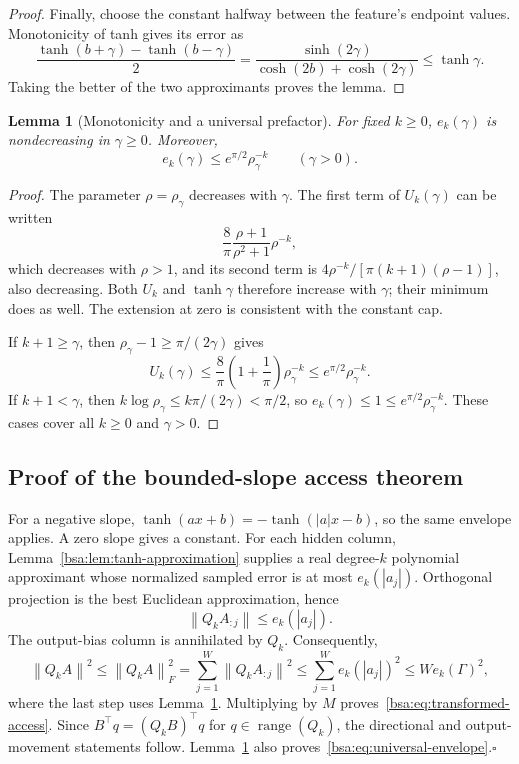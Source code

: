 \documentclass[11pt,letterpaper]{article}
\newcommand{\bsaNorm}[1]{\left\lVert #1\right\rVert}
\DeclareMathOperator{\bsaRange}{range}
\newtheorem{bsaLemma}{Lemma}[section]
\theoremstyle{remark}
\theoremstyle{plain}
\begin{document}
\begin{proof}
Finally, choose the constant halfway between the feature's endpoint values. Monotonicity of tanh gives its error as
\begin{equation}
 \frac{\tanh(b+\gamma)-\tanh(b-\gamma)}2
 =\frac{\sinh(2\gamma)}{\cosh(2b)+\cosh(2\gamma)}
 \le\tanh\gamma.
 \label{bsa:eq:constant-cap}
\end{equation}
Taking the better of the two approximants proves the lemma.
\end{proof}

\begin{bsaLemma}[Monotonicity and a universal prefactor]
\label{bsa:lem:universal}
For fixed $k\ge0$, $e_k(\gamma)$ is nondecreasing in $\gamma\ge0$. Moreover,
\begin{equation}
 e_k(\gamma)\le e^{\pi/2}\rho_\gamma^{-k}\qquad(\gamma>0).
 \label{bsa:eq:universal-feature}
\end{equation}
\end{bsaLemma}
\begin{proof}
The parameter $\rho=\rho_\gamma$ decreases with $\gamma$. The first term of $U_k(\gamma)$ can be written
\[
 \frac8\pi\frac{\rho+1}{\rho^2+1}\rho^{-k},
\]
which decreases with $\rho>1$, and its second term is
$4\rho^{-k}/[\pi(k+1)(\rho-1)]$, also decreasing. Both $U_k$ and $\tanh\gamma$ therefore increase with $\gamma$; their minimum does as well. The extension at zero is consistent with the constant cap.

If $k+1\ge\gamma$, then $\rho_\gamma-1\ge\pi/(2\gamma)$ gives
\begin{equation}
 U_k(\gamma)\le\frac8\pi\left(1+\frac1\pi\right)\rho_\gamma^{-k}
 \le e^{\pi/2}\rho_\gamma^{-k}.
 \label{bsa:eq:large-degree-envelope}
\end{equation}
If $k+1<\gamma$, then $k\log\rho_\gamma\le k\pi/(2\gamma)<\pi/2$, so
$e_k(\gamma)\le1\le e^{\pi/2}\rho_\gamma^{-k}$. These cases cover all $k\ge0$ and $\gamma>0$.
\end{proof}

\subsection{Proof of the bounded-slope access theorem}
For a negative slope, $\tanh(a x+b)=-\tanh(|a|x-b)$, so the same envelope applies. A zero slope gives a constant. For each hidden column, Lemma~\ref{bsa:lem:tanh-approximation} supplies a real degree-$k$ polynomial approximant whose normalized sampled error is at most $e_k(|a_j|)$. Orthogonal projection is the best Euclidean approximation, hence
\[
 \bsaNorm{Q_kA_{:j}}\le e_k(|a_j|).
\]
The output-bias column is annihilated by $Q_k$. Consequently,
\[
 \bsaNorm{Q_kA}^2\le\bsaNorm{Q_kA}_F^2
 =\sum_{j=1}^W\bsaNorm{Q_kA_{:j}}^2
 \le\sum_{j=1}^W e_k(|a_j|)^2\le W e_k(\Gamma)^2,
\]
where the last step uses Lemma~\ref{bsa:lem:universal}. Multiplying by $M$ proves~\eqref{bsa:eq:transformed-access}. Since
$B^\top q=(Q_kB)^\top q$ for $q\in\bsaRange(Q_k)$, the directional and output-movement statements follow. Lemma~\ref{bsa:lem:universal} also proves~\eqref{bsa:eq:universal-envelope}.\hfill$\square$
\end{document}
